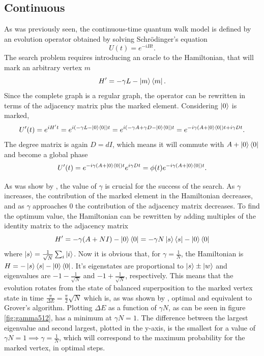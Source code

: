\documentclass[../../dissertation.tex]{subfiles}
\begin{document}
\subsection{Continuous}\label{sec:chap3ContSearch}
As was previously seen, the continuous-time quantum walk model is defined by an evolution operator obtained by solving Schrödinger's equation
\begin{equation}
	U(t) = e^{-iHt}.
\end{equation}
The search problem requires introducing an oracle to the Hamiltonian, that will mark an arbitrary vertex $m$ %
\begin{equation}
	H' = -\gamma L - \ket{m}\bra{m}.
\end{equation}
Since the complete graph is a regular graph, the operator can be rewritten in terms of the adjacency matrix plus the marked element. Considering $\ket{0}$ is marked,
\begin{equation}
	U'(t) = e^{iH't} = e^{i(-\gamma L - \ket{0}\bra{0})t} = e^{i(-\gamma A + \gamma D - \ket{0}\bra{0})t} = e^{-i\gamma(A+\ket{0}\bra{0})t + i\gamma D t}.
\end{equation}
The degree matrix is again $D=dI$, which means it will commute with $A+\ket{0}\bra{0}$ and become a global phase
\begin{equation}
	U'(t) = e^{-i\gamma(A+\ket{0}\bra{0})t}e^{i\gamma D t} = \phi(t)e^{-i\gamma(A+\ket{0}\bra{0})t}.
\end{equation}\par
As was show by \cite{zalka1999}, the value of $\gamma$ is crucial for the success of the search. As $\gamma$ increases, the contribution of the marked element in the Hamiltonian decreases, and as $\gamma$ approaches $0$ the contribution of the adjacency matrix decreases. To find the optimum value, the Hamiltonian can be rewritten by adding multiples of the identity matrix to the adjacency matrix 
\begin{equation}
	H' = -\gamma(A+NI) - \ket{0}\bra{0} = -\gamma N\ket{s}\bra{s} - \ket{0}\bra{0}
\end{equation}
where $\ket{s} = \frac{1}{\sqrt{N}}\sum_i \ket{i}$. Now it is obvious that, for $\gamma = \frac{1}{N}$, the Hamiltonian is $H = -\ket{s}\bra{s} - \ket{0}\bra{0}$. It's eigenstates are proportional to $\ket{s}\pm\ket{w}$ and eigenvalues are $-1 - \frac{1}{\sqrt{N}}$ and $-1 + \frac{1}{\sqrt{N}}$, respectively. This means that the evolution rotates from the state of balanced superposition to the marked vertex state in time $\frac{\pi}{\Delta E} = \frac{\pi}{2}\sqrt{N}$ which is, as was shown by \cite{zalka1999}, optimal and equivalent to Grover's algorithm. Plotting $\Delta E$ as a function of $\gamma N$, as can be seen in figure \ref{fig:gamma512}, has a minimum at $\gamma N =1$. The difference between the largest eigenvalue and second largest, plotted in the y-axis, is the smallest for a value of $\gamma N = 1 \implies \gamma =\frac{1}{N}$, which will correspond to the maximum probability for the marked vertex, in optimal steps.
\end{document}
